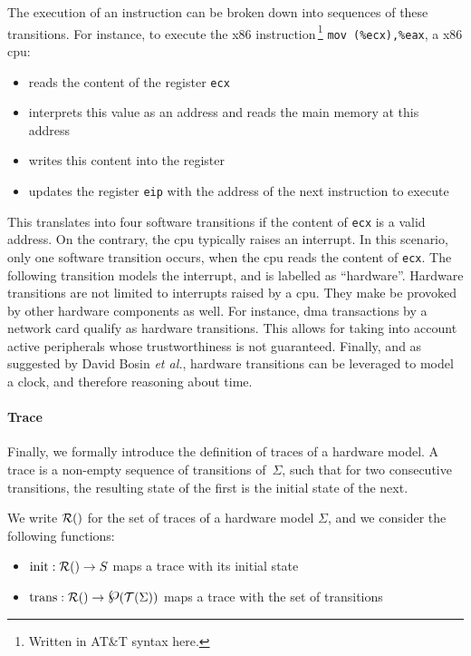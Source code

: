 The execution of an instruction can be broken down into sequences of these
transitions.
%
For instance, to execute the x86 instruction\,\footnote{Written in AT\&T syntax
  here.} \texttt{mov (\%ecx),\%eax}, a x86 \ac{cpu}:
%
\begin{itemize}
\item reads the content of the register \texttt{ecx}
%
\item interprets this value as an address and reads the main memory at this
  address
%
\item writes this content into the register 
%
\item updates the register \texttt{eip} with the address of the next instruction
  to execute
\end{itemize}

This translates into four software transitions if the content of \texttt{ecx} is
a valid address.
%
On the contrary, the \ac{cpu} typically raises an interrupt.
%
In this scenario, only one software transition occurs, when the \ac{cpu} reads
the content of \texttt{ecx}.
%
The following transition models the interrupt, and is labelled as ``hardware''.
%
Hardware transitions are not limited to interrupts raised by a \ac{cpu}.
%
They make be provoked by other hardware components as well.
%
For instance, \ac{dma} transactions by a network card qualify as hardware
transitions.
%
This allows for taking into account active peripherals whose trustworthiness is
not guaranteed.
%
Finally, and as suggested by David Bosin \emph{et al.}, hardware transitions can
be leveraged to model a clock, and therefore reasoning about time.

\paragraph{Trace}
%
Finally, we formally introduce the definition of traces of a hardware model.
%
A trace is a non-empty sequence of transitions of~$\Sigma$, such that for two
consecutive transitions, the resulting state of the first is the initial state
of the next.

\begin{definition}[Traces]
  \label{def:speccert:trace}
  We write $\pathesLTS{Ez}$ for the set of traces of a hardware model $\Sigma$,
  and we consider the following functions:
  \begin{itemize}
  \item $\func{init} : \pathesLTS{Ez} \rightarrow S$ maps a trace with its
    initial state
  \item
    $\func{trans} : \pathesLTS{Ez} \rightarrow \powerset(\mathcal{T}(\Sigma))$
    maps a trace with the set of transitions
  \end{itemize}
\end{definition}

